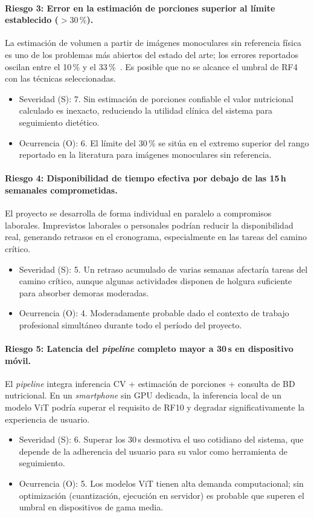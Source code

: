\documentclass[
11pt, %
]{charter}
\begin{document}
\paragraph{Riesgo 3: Error en la estimación de porciones superior al límite establecido ($>30\,\%$).}
La estimación de volumen a partir de imágenes monoculares sin referencia física es uno de los problemas más abiertos del estado del arte; los errores reportados oscilan entre el 10\,\% y el 33\,\%~\cite{martinezgarcia2023}. Es posible que no se alcance el umbral de RF4 con las técnicas seleccionadas.
\begin{itemize}
	\item Severidad (S): 7. Sin estimación de porciones confiable el valor nutricional calculado es inexacto, reduciendo la utilidad clínica del sistema para seguimiento dietético.
	\item Ocurrencia (O): 6. El límite del 30\,\% se sitúa en el extremo superior del rango reportado en la literatura para imágenes monoculares sin referencia.
\end{itemize}

\paragraph{Riesgo 4: Disponibilidad de tiempo efectiva por debajo de las 15\,h semanales comprometidas.}
El proyecto se desarrolla de forma individual en paralelo a compromisos laborales. Imprevistos laborales o personales podrían reducir la disponibilidad real, generando retrasos en el cronograma, especialmente en las tareas del camino crítico.
\begin{itemize}
	\item Severidad (S): 5. Un retraso acumulado de varias semanas afectaría tareas del camino crítico, aunque algunas actividades disponen de holgura suficiente para absorber demoras moderadas.
	\item Ocurrencia (O): 4. Moderadamente probable dado el contexto de trabajo profesional simultáneo durante todo el período del proyecto.
\end{itemize}

\paragraph{Riesgo 5: Latencia del \textit{pipeline} completo mayor a 30\,s en dispositivo móvil.}
El \textit{pipeline} integra inferencia CV + estimación de porciones + consulta de BD nutricional. En un \textit{smartphone} sin GPU dedicada, la inferencia local de un modelo ViT podría superar el requisito de RF10 y degradar significativamente la experiencia de usuario.
\begin{itemize}
	\item Severidad (S): 6. Superar los 30\,s desmotiva el uso cotidiano del sistema, que depende de la adherencia del usuario para su valor como herramienta de seguimiento.
	\item Ocurrencia (O): 5. Los modelos ViT tienen alta demanda computacional; sin optimización (cuantización, ejecución en servidor) es probable que superen el umbral en dispositivos de gama media.
\end{itemize}
\end{document}
